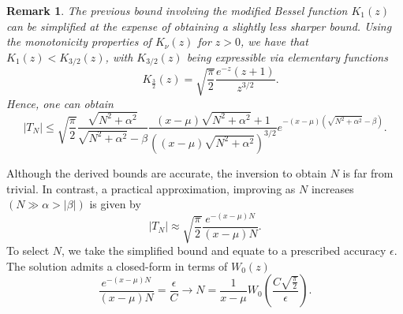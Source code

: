 \documentclass[10pt,a4paper,oneside]{article}
\newtheorem{remark}[theorem]{Remark}
\numberwithin{equation}{section}
\begin{document}
\begin{remark}The previous bound involving the modified Bessel function $K_1(z)$ can be simplified at the expense of obtaining a slightly less sharper bound. Using the monotonicity properties of $K_{\nu}(z)$ for $z > 0$, we have that $K_1(z) < K_{3/2}(z)$, with $K_{3/2}(z)$ being expressible via elementary functions
\begin{equation*}
\quad K_{\frac{3}{2}}(z) = \sqrt{\frac{\pi}{2}}\frac{e^{-z} (z+1)}{z^{3/2}}.
\end{equation*}
Hence, one can obtain
\begin{equation}
|T_N| \le  \sqrt{\frac{\pi}{2}}\frac{\sqrt{N^2 + \alpha^2}}{\sqrt{N^2 + \alpha^2} - \beta} \frac{(x-\mu)\sqrt{N^2 + \alpha^2} + 1}{\left((x-\mu) \sqrt{N^2 + \alpha^2}\right)^{3/2}} e^{-(x-\mu)\left(\sqrt{N^2 + \alpha^2} - \beta\right)}.
\end{equation}
\end{remark}
Although the derived bounds are accurate, the inversion to obtain $N$ is far from trivial. In contrast, a practical approximation, improving as $N$ increases $(N \gg \alpha > |\beta|)$ is given by
\begin{equation}
|T_N| \approx \sqrt{\frac{\pi}{2}} \frac{e^{-(x-\mu)N}}{(x-\mu) N}.
\end{equation}
To select $N$, we take the simplified bound and equate to a prescribed accuracy $\epsilon$. The solution admits a closed-form in terms of $W_0(z)$
\begin{equation}
\frac{e^{-(x-\mu)N}}{(x-\mu)N} = \frac{\epsilon}{C} \longrightarrow N = \frac{1}{x-\mu}W_0\left(\frac{C \sqrt{\frac{\pi}{2}}}{\epsilon}\right).
\end{equation}
\end{document}
